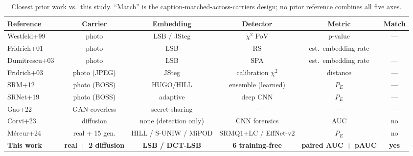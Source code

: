 \documentclass[10pt,twocolumn,a4paper]{article}
\begin{document}
\begin{table}[t]
\centering\footnotesize
\caption{Closest prior work vs.\ this study. ``Match'' is the caption-matched-across-carriers design; no prior reference combines all five axes.}
\label{tab:relatedwork}
\setlength{\tabcolsep}{4pt}\renewcommand{\arraystretch}{1.15}
\begin{tabular}{@{}l c c c c c@{}}
\toprule
\textbf{Reference} & \textbf{Carrier} & \textbf{Embedding} & \textbf{Detector} & \textbf{Metric} & \textbf{Match} \\
\midrule
Westfeld+99~\cite{westfeld1999chi}      & photo            & LSB / JSteg     & $\chi^2$ PoV          & p-value    & --- \\
Fridrich+01~\cite{fridrich2001lsb}      & photo            & LSB             & RS                    & est.\ embedding rate & --- \\
Dumitrescu+03~\cite{dumitrescu2003sp}   & photo            & LSB             & SPA                   & est.\ embedding rate & --- \\
Fridrich+03~\cite{fridrich2003calib}    & photo (JPEG)     & JSteg           & calibration $\chi^2$  & distance   & --- \\
SRM+12~\cite{fridrich2012srm}           & photo (BOSS)     & HUGO/HILL       & ensemble (learned)    & $P_E$      & --- \\
SRNet+19~\cite{boroumand2019srnet}      & photo (BOSS)     & adaptive        & deep CNN              & $P_E$      & --- \\
Gao+22~\cite{gao2022ai}                 & GAN-coverless    & secret-sharing  & ---                   & ---        & --- \\
Corvi+23~\cite{corvi2023diffusion}      & diffusion        & none (detection only) & CNN forensics   & AUC        & no  \\
M\'ereur+24~\cite{mereur2024deepfake}   & real + 15 gen.   & HILL / S-UNIW / MiPOD  & SRMQ1+LC / EffNet-v2  & $P_E$      & no  \\
\midrule
\textbf{This work} & \textbf{real + 2 diffusion} & \textbf{LSB / DCT-LSB} & \textbf{6 training-free} & \textbf{paired AUC + pAUC} & \textbf{yes} \\
\bottomrule
\end{tabular}
\end{table}
\end{document}
